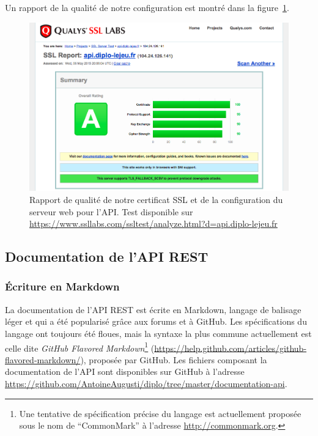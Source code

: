 		Un rapport de la qualité de notre configuration est montré dans la figure~\ref{fig:qualite-ssl}.

		\begin{figure}[H]
			\centering
			\includegraphics[width=1\textwidth]{images/qualite-ssl.png}
			\caption{Rapport de qualité de notre certificat SSL et de la configuration du serveur web pour l'API. Test disponible sur \url{https://www.ssllabs.com/ssltest/analyze.html?d=api.diplo-lejeu.fr}}
			\label{fig:qualite-ssl}
		\end{figure}

	\subsection{Documentation de l'API REST}
		\subsubsection{Écriture en Markdown}
			La documentation de l'API REST est écrite en Markdown, langage de balisage léger et qui a été popularisé grâce aux forums et à GitHub. Les spécifications du langage ont toujours été floues, mais la syntaxe la plus commune actuellement est celle dite \textit{GitHub Flavored Markdown}\footnote{Une tentative de spécification précise du langage est actuellement proposée sous le nom de \enquote{CommonMark} à l'adresse \url{http://commonmark.org}.} (\url{https://help.github.com/articles/github-flavored-markdown/}), proposée par GitHub. Les fichiers composant la documentation de l'API sont disponibles sur GitHub à l'adresse \url{https://github.com/AntoineAugusti/diplo/tree/master/documentation-api}.\\

